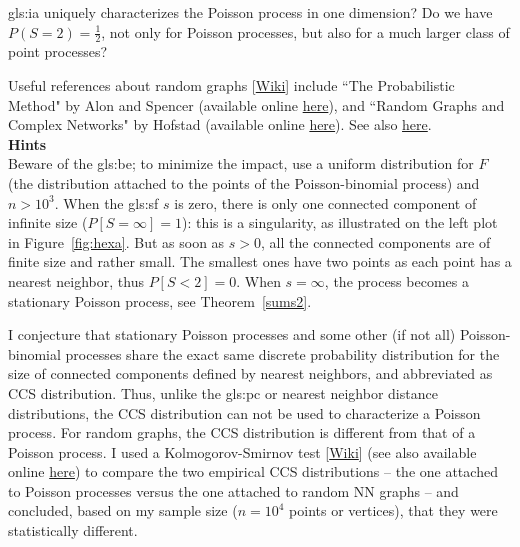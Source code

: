 \documentclass[10pt]{article}
\begin{document}
\begin{Exercise}
\begin{itemize}
\gls{gls:ia}
uniquely characterizes the Poisson process in one dimension? Do we have $P(S=2)=\frac{1}{2}$, not only for Poisson processes, but also for a much larger class of point processes? 
\end{itemize}
 Useful references about random graphs [\href{https://en.wikipedia.org/wiki/Random_graph}{Wiki}] include ``The Probabilistic Method" by Alon and Spencer \cite{probme} 
(available online \href{http://math.bme.hu/~gabor/oktatas/SztoM/AlonSpencer.ProbMethod3ed.pdf}{here}), and 
``Random Graphs and Complex Networks" by Hofstad \cite{rvdh} (available online
 \href{https://www.win.tue.nl/~rhofstad/NotesRGCN.html}{here}). See also \href{https://math.stackexchange.com/questions/3883829/distribution-of-size-of-connected-components-in-erdos-renyi-random-graphs-in-the}{here}. \vspace{1ex}\\
{\bf Hints} \nopagebreak \vspace{1ex}\\
Beware of the \gls{gls:be}; to minimize the impact, use a uniform distribution for $F$ (the distribution attached to the points of the
Poisson-binomial process) and $n>10^3$. When the \gls{gls:sf} $s$ is zero, there is only one connected component of infinite size 
($P[S=\infty]=1$): this is a singularity, as illustrated on the left plot in Figure~\ref{fig:hexa}. But as soon as $s>0$, all the connected components are of finite size
and rather small. The smallest ones have two points as each point has a nearest neighbor, thus $P[S<2]=0$. When $s=\infty$, the process becomes a stationary Poisson process,
see Theorem~\ref{sums2}. 

I conjecture that stationary Poisson processes and some other (if not all) Poisson-binomial processes share the exact same discrete probability distribution for the size of connected components defined by nearest neighbors, and abbreviated as CCS distribution. Thus, 
unlike the \gls{gls:pc} or 
\textcolor{index}{nearest neighbor} distance distributions,
the CCS distribution can not be used to characterize a Poisson process. For random graphs, the CCS distribution is different from that of a Poisson process. I used a \textcolor{index}{Kolmogorov-Smirnov test}
[\href{https://en.wikipedia.org/wiki/Kolmogorov-Smirnov_test}{Wiki}] (see also \cite{kst} available online \href{https://projecteuclid.org/journals/annals-of-mathematical-statistics/volume-19/issue-2/On-the-Kolmogorov-Smirnov-Limit-Theorems-for-Empirical-Distributions/10.1214/aoms/1177730243.full}{here}) to compare the two empirical CCS distributions  -- the one attached to Poisson processes versus the one attached to random NN graphs --  and concluded, based on my sample size ($n=10^4$ points or vertices), that they were statistically different. 


\end{Exercise}
\end{document}
